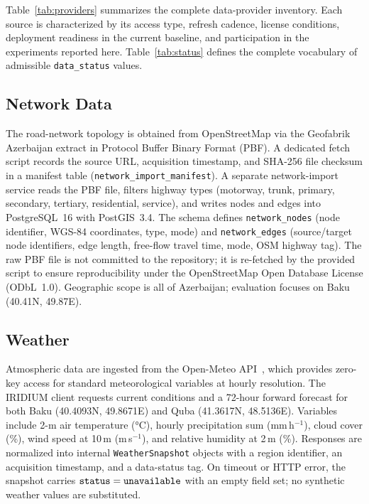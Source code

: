 
Table~\ref{tab:providers} summarizes the complete data-provider inventory.
Each source is characterized by its access type, refresh cadence, license
conditions, deployment readiness in the current baseline, and participation
in the experiments reported here.
Table~\ref{tab:status} defines the complete vocabulary of admissible
\texttt{data\_status} values.

\subsection{Network Data}

The road-network topology is obtained from OpenStreetMap via the Geofabrik
Azerbaijan extract in Protocol Buffer Binary Format (PBF).
A dedicated fetch script records the source URL, acquisition timestamp, and
SHA-256 file checksum in a manifest table
(\texttt{network\_import\_manifest}).
A separate network-import service reads the PBF file, filters highway types
(motorway, trunk, primary, secondary, tertiary, residential, service), and
writes nodes and edges into PostgreSQL~16 with PostGIS~3.4.
The schema defines \texttt{network\_nodes} (node identifier, WGS-84
coordinates, type, mode) and \texttt{network\_edges} (source/target node
identifiers, edge length, free-flow travel time, mode, OSM highway tag).
The raw PBF file is not committed to the repository; it is re-fetched by the
provided script to ensure reproducibility under the OpenStreetMap
Open Database License (ODbL~1.0).
Geographic scope is all of Azerbaijan; evaluation focuses on Baku
(40.41\textdegree{}N, 49.87\textdegree{}E).

\subsection{Weather}

Atmospheric data are ingested from the Open-Meteo
API~\cite{zippenfenig2023openmeteo}, which provides zero-key access for
standard meteorological variables at hourly resolution.
The IRIDIUM client requests current conditions and a 72-hour forward
forecast for both Baku (40.4093\textdegree{}N, 49.8671\textdegree{}E) and
Quba (41.3617\textdegree{}N, 48.5136\textdegree{}E).
Variables include 2-m air temperature (°C), hourly precipitation sum
(mm\,h$^{-1}$), cloud cover (\%), wind speed at 10\,m (m\,s$^{-1}$), and
relative humidity at 2\,m (\%).
Responses are normalized into internal \texttt{WeatherSnapshot} objects
with a region identifier, an acquisition timestamp, and a data-status tag.
On timeout or HTTP error, the snapshot carries $\mathtt{status} = \texttt{unavailable}$
with an empty field set; no synthetic weather values are substituted.

